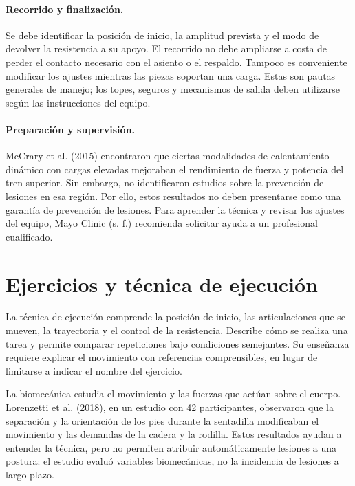 \paragraph{Recorrido y finalización.}
Se debe identificar la posición de inicio, la amplitud prevista y el modo de devolver la resistencia a su apoyo. El recorrido no debe ampliarse a costa de perder el contacto necesario con el asiento o el respaldo. Tampoco es conveniente modificar los ajustes mientras las piezas soportan una carga. Estas son pautas generales de manejo; los topes, seguros y mecanismos de salida deben utilizarse según las instrucciones del equipo.

\paragraph{Preparación y supervisión.}
McCrary et al. (2015) encontraron que ciertas modalidades de calentamiento dinámico con cargas elevadas mejoraban el rendimiento de fuerza y potencia del tren superior. Sin embargo, no identificaron estudios sobre la prevención de lesiones en esa región. Por ello, estos resultados no deben presentarse como una garantía de prevención de lesiones. Para aprender la técnica y revisar los ajustes del equipo, Mayo Clinic (s. f.) recomienda solicitar ayuda a un profesional cualificado.

\section{Ejercicios y técnica de ejecución}
\label{sec:tecnica-ejecucion}

La técnica de ejecución comprende la posición de inicio, las articulaciones que se mueven, la trayectoria y el control de la resistencia. Describe cómo se realiza una tarea y permite comparar repeticiones bajo condiciones semejantes. Su enseñanza requiere explicar el movimiento con referencias comprensibles, en lugar de limitarse a indicar el nombre del ejercicio.

La biomecánica estudia el movimiento y las fuerzas que actúan sobre el cuerpo. Lorenzetti et al. (2018), en un estudio con 42 participantes, observaron que la separación y la orientación de los pies durante la sentadilla modificaban el movimiento y las demandas de la cadera y la rodilla. Estos resultados ayudan a entender la técnica, pero no permiten atribuir automáticamente lesiones a una postura: el estudio evaluó variables biomecánicas, no la incidencia de lesiones a largo plazo.

